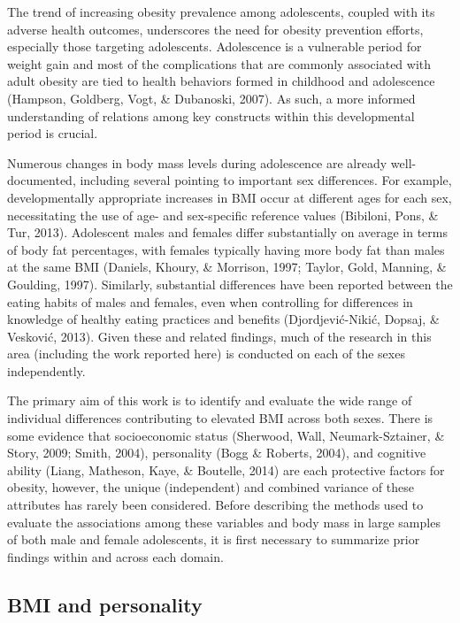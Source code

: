 \documentclass[man]{apa6}
\begin{document}
The trend of increasing obesity prevalence among adolescents, coupled with its adverse health outcomes, underscores the need for obesity prevention efforts, especially those targeting adolescents. Adolescence is a vulnerable period for weight gain and most of the complications that are commonly associated with adult obesity are tied to health behaviors formed in childhood and adolescence (Hampson, Goldberg, Vogt, \& Dubanoski, 2007). As such, a more informed understanding of relations among key constructs within this developmental period is crucial.

Numerous changes in body mass levels during adolescence are already well-documented, including several pointing to important sex differences. For example, developmentally appropriate increases in BMI occur at different ages for each sex, necessitating the use of age- and sex-specific reference values (Bibiloni, Pons, \& Tur, 2013). Adolescent males and females differ substantially on average in terms of body fat percentages, with females typically having more body fat than males at the same BMI (Daniels, Khoury, \& Morrison, 1997; Taylor, Gold, Manning, \& Goulding, 1997). Similarly, substantial differences have been reported between the eating habits of males and females, even when controlling for differences in knowledge of healthy eating practices and benefits (Djordjević-Nikić, Dopsaj, \& Vesković, 2013). Given these and related findings, much of the research in this area (including the work reported here) is conducted on each of the sexes independently.

The primary aim of this work is to identify and evaluate the wide range of individual differences contributing to elevated BMI across both sexes. There is some evidence that socioeconomic status (Sherwood, Wall, Neumark-Sztainer, \& Story, 2009; Smith, 2004), personality (Bogg \& Roberts, 2004), and cognitive ability (Liang, Matheson, Kaye, \& Boutelle, 2014) are each protective factors for obesity, however, the unique (independent) and combined variance of these attributes has rarely been considered. Before describing the methods used to evaluate the associations among these variables and body mass in large samples of both male and female adolescents, it is first necessary to summarize prior findings within and across each domain.

\hypertarget{bmi-and-personality}{%
\subsection{BMI and personality}\label{bmi-and-personality}}
\end{document}
